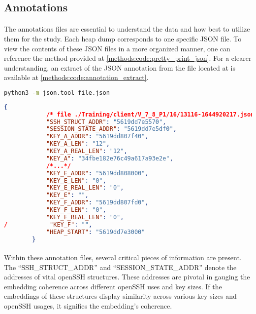     \subsection*{Annotations}
        \paragraph{}The annotations files are essential to understand the data and how best to utilize them for the study. Each heap dump corresponds to one specific JSON file. To view the contents of these JSON files in a more organized manner, one can reference the method provided at \ref{methods:code:pretty_print_json}. For a clearer understanding, an extract of the JSON annotation from the file located at  is available at \ref{methods:code:annotation_extract}.

        \begin{lstlisting}[caption={pretty print JSON}, label=methods:code:pretty_print_json, language=bash]
            python3 -m json.tool file.json
        \end{lstlisting}

        \noindent
        \begin{minipage}{\linewidth}
        \begin{lstlisting}[language=json, caption={An extract of the JSON annotations}, label=methods:code:annotation_extract]
        {
            /* file ./Training/client/V_7_8_P1/16/13116-1644920217.json*/
            "SSH_STRUCT_ADDR": "5619dd7e5570",
            "SESSION_STATE_ADDR": "5619dd7e5df0",
            "KEY_A_ADDR": "5619dd807f40",
            "KEY_A_LEN": "12",
            "KEY_A_REAL_LEN": "12",
            "KEY_A": "34fbe182e76c49a617a93e2e",
            /*...*/
            "KEY_E_ADDR": "5619dd808000",
            "KEY_E_LEN": "0",
            "KEY_E_REAL_LEN": "0",
            "KEY_E": "",
            "KEY_F_ADDR": "5619dd807fd0",
            "KEY_F_LEN": "0",
            "KEY_F_REAL_LEN": "0",
/            "KEY_F": "",
            "HEAP_START": "5619dd7e3000"
        }
        \end{lstlisting}
        \end{minipage}

        \paragraph{}Within these annotation files, several critical pieces of information are present. The ``SSH\_STRUCT\_ADDR'' and ``SESSION\_STATE\_ADDR'' denote the addresses of vital openSSH structures. These addresses are pivotal in gauging the embedding coherence across different openSSH uses and key sizes. If the embeddings of these structures display similarity across various key sizes and openSSH usages, it signifies the embedding's coherence.

